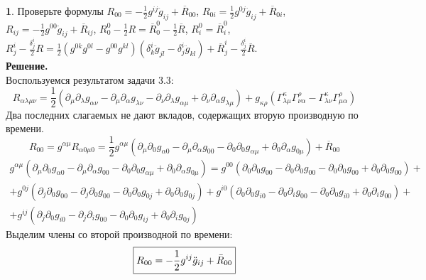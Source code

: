 \documentclass[12pt]{article}
\theoremstyle{definition}
\newtheorem{zad}{}[section]
\begin{document}
\begin{zad}
Проверьте формулы $R_{00}=-\frac{1}{2}g^{ij}\ddot{g}_{ij}+\overline{R}_{00}$, $R_{0i}=\frac{1}{2}g^{0j}\ddot{g}_{ij}+\overline{R}_{0i}$, $R_{ij}=-\frac{1}{2}g^{00}\ddot{g}_{ij}+\overline{R}_{ij}$, $R_0^0-\frac{1}{2}R=\overline{R}_0^0-\frac{1}{2}\overline{R}$, $R_i^0=\overline{R}_i^0$, $R^i_j-\frac{\delta^i_j}{2}R=\frac{1}{2}(g^{0k}g^{0l}-g^{00}g^{kl})(\delta^i_k\ddot{g}_{jl}-\delta^i_j\ddot{g}_{kl})+\overline{R}^i_j-\frac{\delta^i_j}{2}\overline{R}$.\\
\textbf{Решение.}\\
Воспользуемся результатом задачи 3.3:
\begin{equation}
    R_{\alpha\lambda\mu\nu}=\frac{1}{2}(\partial_\mu\partial_\lambda g_{\alpha\nu}-\partial_\mu\partial_\alpha g_{\lambda\nu}-\partial_\nu\partial_\lambda g_{\alpha\mu}+\partial_\nu\partial_\alpha g_{\lambda\mu})+g_{\kappa\rho}(\Gamma^\kappa_{\lambda\mu}\Gamma^\rho_{\nu\alpha}-\Gamma^\kappa_{\lambda\nu}\Gamma^\rho_{\mu\alpha})
\end{equation}
Два последних слагаемых не дают вкладов, содержащих вторую производную по времени.
\begin{equation}
    R_{00}=g^{\alpha\mu}R_{\alpha0\mu0}=\frac12g^{\alpha\mu}(\partial_\mu\partial_0 g_{\alpha0}-\partial_\mu\partial_\alpha g_{00}-\partial_0\partial_0 g_{\alpha\mu}+\partial_0\partial_\alpha g_{0\mu})+\overline{R}_{00}
\end{equation}
\begin{multline}
    g^{\alpha\mu}(\partial_\mu\partial_0 g_{\alpha0}-\partial_\mu\partial_\alpha g_{00}-\partial_0\partial_0 g_{\alpha\mu}+\partial_0\partial_\alpha g_{0\mu})=g^{00}(\partial_0\partial_0 g_{00}-\partial_0\partial_0 g_{00}-\partial_0\partial_0 g_{00}+\partial_0\partial_0 g_{00})+\\+g^{0j}(\partial_j\partial_0 g_{00}-\partial_j\partial_0 g_{00}-\partial_0\partial_0 g_{0j}+\partial_0\partial_0 g_{0j})+g^{i0}(\partial_0\partial_0 g_{i0}-\partial_0\partial_i g_{00}-\partial_0\partial_0 g_{i0}+\partial_0\partial_i g_{00})+\\+g^{ij}(\partial_j\partial_0 g_{i0}-\partial_j\partial_i g_{00}-\partial_0\partial_0 g_{ij}+\partial_0\partial_i g_{0j})
\end{multline}
Выделим члены со второй производной по времени:
\begin{equation}
    \boxed{R_{00}=-\frac{1}{2}g^{ij}\ddot{g}_{ij}+\Bar{R}_{00}}
\end{equation}
\begin{equation}

\end{equation}
\end{zad}
\end{document}
